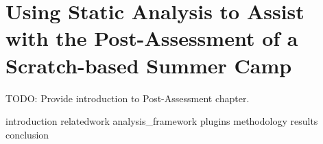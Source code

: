 \chapter{Using Static Analysis to Assist with the Post-Assessment of a
               Scratch-based Summer Camp}
\label{chap:hairball}

\def\currentprefix{hairball}

TODO: Provide introduction to Post-Assessment chapter.

{introduction}
{relatedwork}
{analysis_framework}
{plugins}
{methodology}
{results}
{conclusion}
